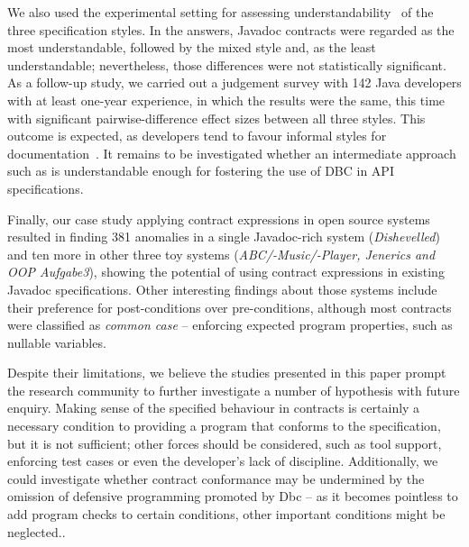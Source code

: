 We also used the experimental setting for assessing understandability~\cite{Scalabrino2017} of the three  specification styles. 
In the answers, Javadoc contracts were regarded as the most understandable, followed by the mixed \contractjdoc{} style and, as the least understandable; nevertheless, those differences were not statistically significant. As a follow-up study, we carried out a judgement survey with 142 Java developers with at least one-year experience, in which the results were the same, this time with significant pairwise-difference effect sizes between all three styles.
This outcome is expected, as developers tend to favour informal styles for documentation~\cite{Polikarpova-etal09}. It remains to be investigated whether an intermediate approach such as \contractjdoc{} is understandable enough for fostering the use of DBC in API specifications.

Finally, our case study applying contract expressions in open source systems resulted in finding 381 anomalies in a single Javadoc-rich system (\emph{Dishevelled}) and ten more in other three toy systems (\emph{ABC/-Music/-Player, Jenerics and OOP Aufgabe3}), showing the potential of using contract expressions in existing Javadoc specifications.
Other interesting findings about those systems include their preference for post-conditions over pre-conditions, although most contracts were classified as \emph{common case} -- enforcing expected program properties, such as nullable variables.

Despite their limitations, we believe the studies presented in this paper prompt the research community to further investigate a number of hypothesis with future enquiry. 
Making sense of the specified behaviour in contracts is certainly a necessary condition to providing a program that conforms to the specification, but it is not sufficient; other forces should be considered, such as tool support, enforcing test cases or even the developer's lack of discipline.  
Additionally, we could investigate whether contract conformance may be undermined by the omission of defensive programming promoted by Dbc -- as it becomes pointless to add program checks to certain conditions, other important conditions might be neglected.. 



